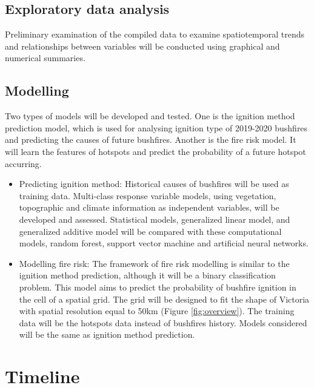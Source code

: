 \documentclass[11pt,a4paper,]{article}
\begin{document}
\hypertarget{exploratory-data-analysis}{%
\subsection{Exploratory data analysis}\label{exploratory-data-analysis}}

Preliminary examination of the compiled data to examine spatiotemporal trends and relationships between variables will be conducted using graphical and numerical summaries.

\hypertarget{modelling}{%
\subsection{Modelling}\label{modelling}}

Two types of models will be developed and tested. One is the ignition method prediction model, which is used for analysing ignition type of 2019-2020 bushfires and predicting the causes of future bushfires. Another is the fire risk model. It will learn the features of hotspots and predict the probability of a future hotspot accurring.

\begin{itemize}
\item
  Predicting ignition method: Historical causes of bushfires will be used as training data. Multi-class response variable models, using vegetation, topographic and climate information as independent variables, will be developed and assessed. Statistical models, generalized linear model, and generalized additive model will be compared with these computational models, random forest, support vector machine and artificial neural networks.
\item
  Modelling fire risk: The framework of fire risk modelling is similar to the ignition method prediction, although it will be a binary classification problem. This model aims to predict the probability of bushfire ignition in the cell of a spatial grid. The grid will be designed to fit the shape of Victoria with spatial resolution equal to 50km (Figure \ref{fig:overview}). The training data will be the hotspots data instead of bushfires history. Models considered will be the same as ignition method prediction.
\end{itemize}

\hypertarget{timeline}{%
\section{Timeline}\label{timeline}}
\end{document}

